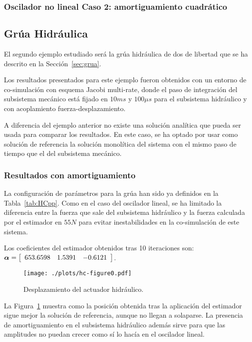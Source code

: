 \subsubsection{Oscilador no lineal Caso 2: amortiguamiento cuadrático}
\label{subsec:res_osciladorNL2}

\subsection{Grúa Hidráulica}
\label{sec:res_grua}

El segundo ejemplo estudiado será la grúa hidráulica de dos de libertad que se ha descrito en la Sección~\ref{sec:grua}. 

Los resultados presentados para este ejemplo fueron obtenidos con un entorno de co-simulación con esquema Jacobi multi-rate, donde el paso de integración del subsistema mecánico está fijado en $10\unit{ms}$ y $100\unit{\mu s}$ para el subsistema hidráulico y con acoplamiento fuerza-desplazamiento.

A diferencia del ejemplo anterior no existe una solución analítica que pueda ser usada para comparar los resultados.
En este caso, se ha optado por usar como solución de referencia la solución monolítica del sistema con el mismo paso de tiempo que el del subsistema mecánico.

\subsubsection{Resultados con amortiguamiento}
\label{subsec:res_grua}

La configuración de parámetros para la grúa han sido ya definidos en la Tabla~\ref{tab:HCpp}.
Como en el caso del oscilador lineal, se ha limitado la diferencia entre la fuerza que sale del subsistema hidráulico y la fuerza calculada por el estimador en $55\unit{N}$ para evitar inestabilidades en la co-simulación de este sistema.


Los coeficientes del estimador obtenidos tras 10 iteraciones son:
$\coefficients = \sqbr{\matr{ccc}{653.6598 & 1.5391 & -0.6121}}$.


\begin{figure}[ht!]\centering
	\texttt{[image: ./plots/hc-figure0.pdf]}
	\caption{Desplazamiento del actuador hidráulico.}
	\label{fig:GruaPos}
\end{figure}

La Figura~\ref{fig:GruaPos} muestra como la posición obtenida tras la aplicación del estimador sigue mejor la solución de referencia, aunque no llegan a solaparse.
La presencia de amortiguamiento en el subsistema hidráulico además sirve para que las amplitudes no puedan crecer como sí lo hacía en el oscilador lineal.


